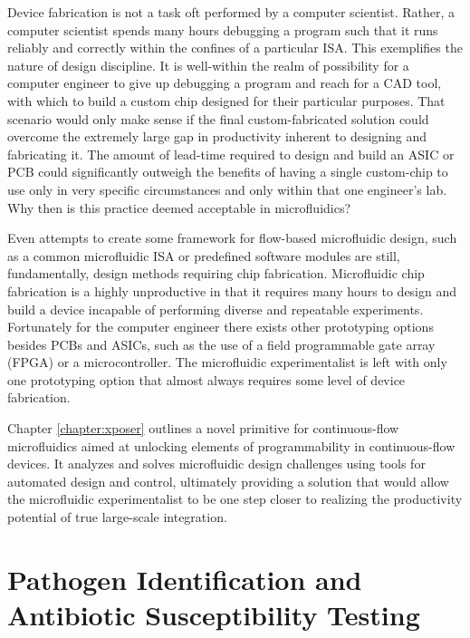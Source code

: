 Device fabrication is not a task oft performed by a computer scientist. Rather, a computer scientist spends many hours debugging a program such that it runs reliably and correctly within the confines of a particular ISA. This exemplifies the nature of design discipline. It is well-within the realm of possibility for a computer engineer to give up debugging a program and reach for a CAD tool, with which to build a custom chip designed for their particular purposes. That scenario would only make sense if the final custom-fabricated solution could overcome the extremely large gap in productivity inherent to designing and fabricating it. The amount of lead-time required to design and build an ASIC or PCB could significantly outweigh the benefits of having a single custom-chip to use only in very specific circumstances and only within that one engineer's lab. Why then is this practice deemed acceptable in microfluidics?

Even attempts to create some framework for flow-based microfluidic design, such as a common microfluidic ISA\cite{amin2009} or predefined software modules \cite{soe2013} are still, fundamentally, design methods requiring chip fabrication. Microfluidic chip fabrication is a highly unproductive in that it requires many hours to design and build a device incapable of performing diverse and repeatable experiments. Fortunately for the computer engineer there exists other prototyping options besides PCBs and ASICs, such as the use of a field programmable gate array (FPGA) or a microcontroller. The microfluidic experimentalist is left with only one prototyping option that almost always requires some level of device
fabrication.

Chapter \ref{chapter:xposer} outlines a novel primitive for continuous-flow microfluidics aimed at unlocking elements of programmability in continuous-flow devices. It analyzes and solves microfluidic design challenges using tools for automated design and control, ultimately providing a solution that would allow the microfluidic experimentalist to be one step closer to realizing the productivity potential of true large-scale integration. 


\section{Pathogen Identification and Antibiotic Susceptibility Testing}
\label{sec:cellSep}

